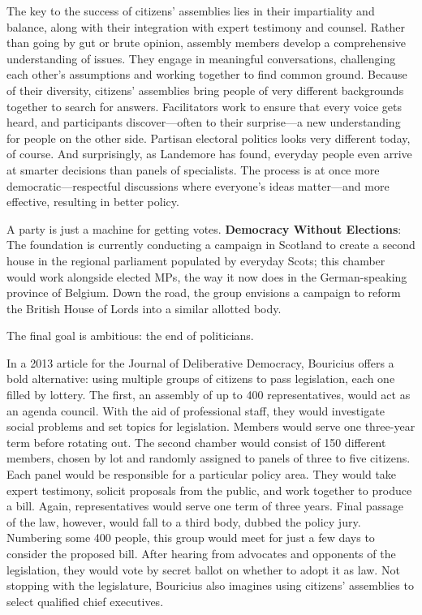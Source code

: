 \documentclass[
]{book}
\begin{document}
The key to the success of citizens' assemblies lies in their impartiality and balance, along with their integration with expert testimony and counsel. Rather than going by gut or brute opinion, assembly members develop a comprehensive understanding of issues. They engage in meaningful conversations, challenging each other's assumptions and working together to find common ground. Because of their diversity, citizens' assemblies bring people of very different backgrounds together to search for answers. Facilitators work to ensure that every voice gets heard, and participants discover---often to their surprise---a new understanding for people on the other side. Partisan electoral politics looks very different today, of course. And surprisingly, as Landemore has found, everyday people even arrive at smarter decisions than panels of specialists. The process is at once more democratic---respectful discussions where everyone's ideas matter---and more effective, resulting in better policy.

A party is just a machine for getting votes.
\textbf{Democracy Without Elections}: The foundation is currently conducting a campaign in Scotland to create a second house in the regional parliament populated by everyday Scots; this chamber would work alongside elected MPs, the way it now does in the German-speaking province of Belgium. Down the road, the group envisions a campaign to reform the British House of Lords into a similar allotted body.

The final goal is ambitious: the end of politicians.

In a 2013 article for the Journal of Deliberative Democracy, Bouricius offers a bold alternative: using multiple groups of citizens to pass legislation, each one filled by lottery. The first, an assembly of up to 400 representatives, would act as an agenda council. With the aid of professional staff, they would investigate social problems and set topics for legislation. Members would serve one three-year term before rotating out. The second chamber would consist of 150 different members, chosen by lot and randomly assigned to panels of three to five citizens. Each panel would be responsible for a particular policy area. They would take expert testimony, solicit proposals from the public, and work together to produce a bill. Again, representatives would serve one term of three years. Final passage of the law, however, would fall to a third body, dubbed the policy jury. Numbering some 400 people, this group would meet for just a few days to consider the proposed bill. After hearing from advocates and opponents of the legislation, they would vote by secret ballot on whether to adopt it as law. Not stopping with the legislature, Bouricius also imagines using citizens' assemblies to select qualified chief executives.
\end{document}
